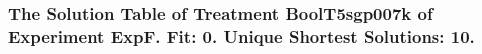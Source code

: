  \begin{frame}
 \fontsize{8pt}{9pt}\selectfont
 \frametitle{ The Solution Table of Treatment BoolT5sgp007k of Experiment ExpF. Fit: 0. Unique Shortest Solutions: 10. }

 \label{ExpFSolutionTable005.tex}  
 \end{frame}

